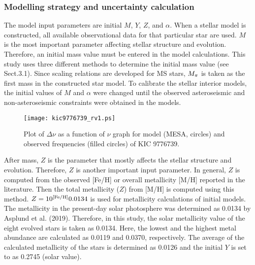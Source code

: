 \documentclass[a4paper,fleqn,usenatbib]{mnras}     %
\begin{document}
{\subsubsection{Modelling strategy and uncertainty calculation}
The model input parameters are initial $M$, $Y$,
$Z$, and $\alpha$.
When a stellar model is constructed,
all available observational data for that
particular star are used.
$M$ is the most important parameter 
affecting stellar structure and evolution.
Therefore, an initial mass value must be 
entered in the model calculations.
This study uses three different methods
 to determine the initial mass value (see Sect.3.1).
Since scaling relations 
are developed for MS stars, 
$M_{\rm \pi}$ is taken as the first 
mass in the constructed star model.
To calibrate the stellar interior models, the initial values of $M$ 
and $\alpha$ were changed until
the observed asteroseismic and non-asteroseismic 
constraints were obtained
in the models. 


\begin{figure}
\begin{center}
\texttt{[image: kic9776739\_rv1.ps]}
        \caption{Plot of ${\Delta\nu}$ as a function of ${\nu}$ graph for model ({\small MESA}, circles) and observed frequencies (filled circles) of KIC 9776739.
}
\end{center}
\end{figure}

After mass, $Z$ is the parameter
that mostly affects the stellar structure and evolution.  
Therefore, $Z$ is another important input parameter. 
In general, $Z$ is computed from the observed [Fe/H] 
or overall metallicity [M/H] reported in the literature.
Then the total metallicity 
($Z$) from [M/H] is computed 
using this method. 
$Z=10^{\rm [Fe/H]} 0.0134$ 
is used for metallicity calculations of initial models.
The metallicity in the present-day solar photosphere 
was determined as
0.0134 by Asplund et al. (2019). 
Therefore, in this study, the solar metallicity value of 
the eight evolved stars is taken as 0.0134.
Here, the lowest and the highest
metal abundance are calculated as 0.0119 and 0.0370, respectively.
The average of the calculated metallicity of 
the stars is determined as 0.0126
and the initial
$Y$ is set to as 0.2745 (solar value).

}
\end{document}
